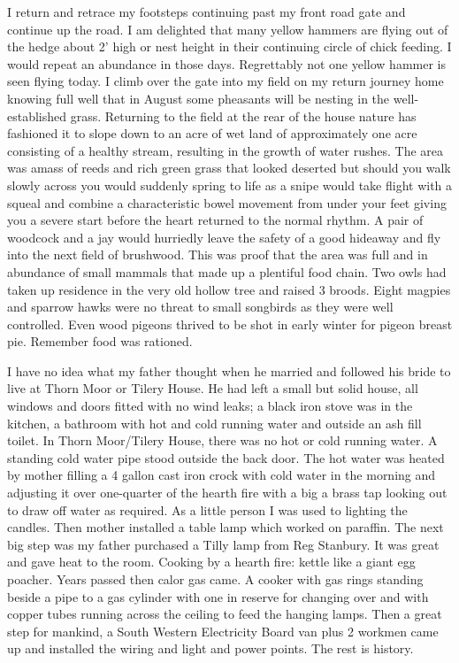 I return and retrace my footsteps continuing past my front road gate and
continue up the road. I am delighted that many yellow hammers are flying out of
the hedge about 2' high or nest height in their continuing circle of chick
feeding. I would repeat an abundance in those days. Regrettably not one yellow
hammer is seen flying today. I climb over the gate into my field on my return
journey home knowing full well that in August some pheasants will be nesting in
the well-established grass. Returning to the field at the rear of the house
nature has fashioned it to slope down to an acre of wet land of approximately
one acre consisting of a healthy stream, resulting in the growth of water
rushes. The area was amass of reeds and rich green grass that looked deserted
but should you walk slowly across you would suddenly spring to life as a snipe
would take flight with a squeal and combine a characteristic bowel movement
from under your feet giving you a severe start before the heart returned to the
normal rhythm. A pair of woodcock and a jay would hurriedly leave the safety of
a good hideaway and fly into the next field of brushwood. This was proof that
the area was full and in abundance of small mammals that made up a plentiful
food chain. Two owls had taken up residence in the very old hollow tree and
raised 3 broods. Eight magpies and sparrow hawks were no threat to small
songbirds as they were well controlled. Even wood pigeons thrived to be shot in
early winter for pigeon breast pie. Remember food was rationed.

I have no idea what my father thought when he married and followed his bride to
live at Thorn Moor or Tilery House. He had left a small but solid house, all
windows and doors fitted with no wind leaks; a black iron stove was in the
kitchen, a bathroom with hot and cold running water and outside an ash fill
toilet. In Thorn Moor/Tilery House, there was no hot or cold running water. A
standing cold water pipe stood outside the back door. The hot water was heated
by mother filling a 4 gallon cast iron crock with cold water in the morning and
adjusting it over one-quarter of the hearth fire with a big a brass tap looking
out to draw off water as required. As a little person I was used to lighting
the candles. Then mother installed a table lamp which worked on paraffin. The
next big step was my father purchased a Tilly lamp from Reg Stanbury. It was
great and gave heat to the room. Cooking by a hearth fire: kettle like a giant
egg poacher. Years passed then calor gas came. A cooker with gas rings standing
beside a pipe to a gas cylinder with one in reserve for changing over and with
copper tubes running across the ceiling to feed the hanging lamps. Then a great
step for mankind, a South Western Electricity Board van plus 2 workmen came up
and installed the wiring and light and power points. The rest is history.
